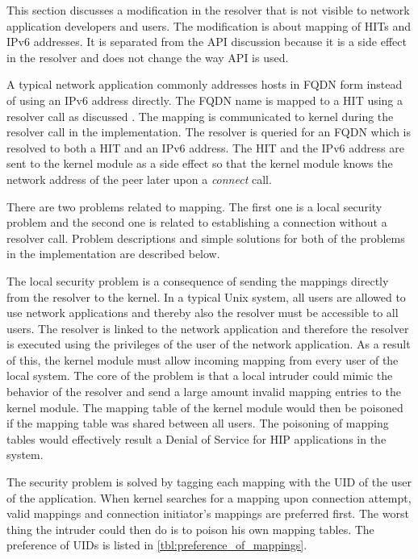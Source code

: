 This section discusses a modification in the resolver that is not
visible to network application developers and users. The modification
is about mapping of HITs and IPv6 addresses. It is separated from the
API discussion  because it is a side
effect in the resolver and does not change the way API is used.

A typical network application commonly addresses hosts in FQDN form
instead of using an IPv6 address directly. The FQDN name is mapped to
a HIT using a resolver call as discussed
. The mapping is communicated to kernel
during the resolver call in the implementation. The resolver is
queried for an FQDN which is resolved to both a HIT and an IPv6
address. The HIT and the IPv6 address are sent to the kernel module as
a side effect so that the kernel module knows the network address of
the peer later upon a \textit{connect} call.

There are two problems related to mapping. The first one is a local
security problem and the second one is related to establishing a
connection without a resolver call. Problem descriptions and simple
solutions for both of the problems in the implementation are described
below.

The local security problem is a consequence of sending the mappings
directly from the resolver to the kernel. In a typical Unix system,
all users are allowed to use network applications and thereby also the
resolver must be accessible to all users. The resolver is linked to
the network application and therefore the resolver is executed using
the privileges of the user of the network application. As a result of
this, the kernel module must allow incoming mapping from every user of
the local system. The core of the problem is that a local intruder
could mimic the behavior of the resolver and send a large amount
invalid mapping entries to the kernel module. The mapping table of the
kernel module would then be poisoned if the mapping table was shared
between all users. The poisoning of mapping tables would effectively
result a Denial of Service for HIP applications in the system.

The security problem is solved by tagging each mapping with the UID of
the user of the application. When kernel searches for a mapping upon
connection attempt, valid mappings and connection initiator's mappings
are preferred first. The worst thing the intruder could then do is to
poison his own mapping tables. The preference of UIDs is listed in
\autoref{tbl:preference_of_mappings}.

